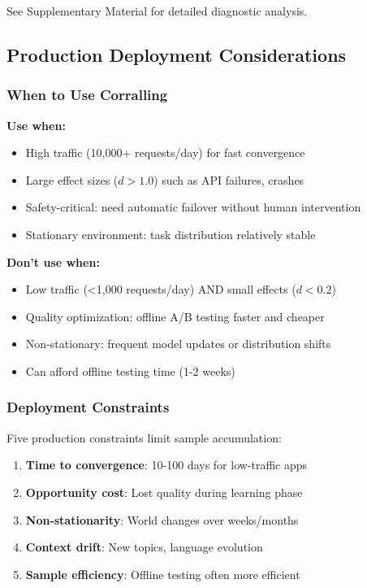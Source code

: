 See Supplementary Material for detailed diagnostic analysis.

\subsection{Production Deployment Considerations}

\subsubsection{When to Use Corralling}

\textbf{Use when:}
\begin{itemize}
    \item High traffic (10,000+ requests/day) for fast convergence
    \item Large effect sizes ($d > 1.0$) such as API failures, crashes
    \item Safety-critical: need automatic failover without human intervention
    \item Stationary environment: task distribution relatively stable
\end{itemize}

\textbf{Don't use when:}
\begin{itemize}
    \item Low traffic (<1,000 requests/day) AND small effects ($d < 0.2$)
    \item Quality optimization: offline A/B testing faster and cheaper
    \item Non-stationary: frequent model updates or distribution shifts
    \item Can afford offline testing time (1-2 weeks)
\end{itemize}

\subsubsection{Deployment Constraints}

Five production constraints limit sample accumulation:
\begin{enumerate}
    \item \textbf{Time to convergence}: 10-100 days for low-traffic apps
    \item \textbf{Opportunity cost}: Lost quality during learning phase
    \item \textbf{Non-stationarity}: World changes over weeks/months
    \item \textbf{Context drift}: New topics, language evolution
    \item \textbf{Sample efficiency}: Offline testing often more efficient
\end{enumerate}

